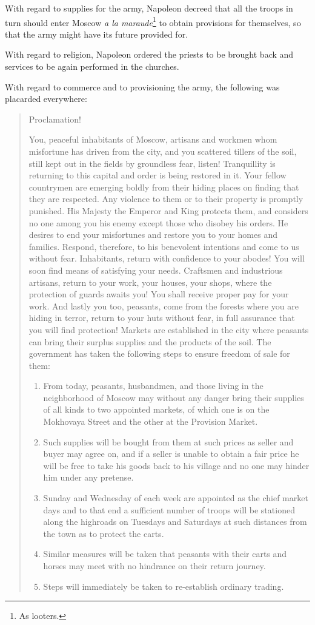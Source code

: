 With regard to supplies for the army, Napoleon decreed that all
the troops in turn should enter Moscow \emph{a la
maraude}\footnote{As looters.} to obtain provisions for
themselves, so that the army might have its future provided for.

With regard to religion, Napoleon ordered the priests to be
brought back and services to be again performed in the churches.

With regard to commerce and to provisioning the army, the
following was placarded everywhere:

\begin{quote} Proclamation!

You, peaceful inhabitants of Moscow, artisans and workmen whom
misfortune has driven from the city, and you scattered tillers of
the soil, still kept out in the fields by groundless fear,
listen!  Tranquillity is returning to this capital and order is
being restored in it. Your fellow countrymen are emerging boldly
from their hiding places on finding that they are respected. Any
violence to them or to their property is promptly punished. His
Majesty the Emperor and King protects them, and considers no one
among you his enemy except those who disobey his orders. He
desires to end your misfortunes and restore you to your homes and
families. Respond, therefore, to his benevolent intentions and
come to us without fear. Inhabitants, return with confidence to
your abodes! You will soon find means of satisfying your
needs. Craftsmen and industrious artisans, return to your work,
your houses, your shops, where the protection of guards awaits
you! You shall receive proper pay for your work. And lastly you
too, peasants, come from the forests where you are hiding in
terror, return to your huts without fear, in full assurance that
you will find protection! Markets are established in the city
where peasants can bring their surplus supplies and the products
of the soil. The government has taken the following steps to
ensure freedom of sale for them: \begin{enumerate} \item From
today, peasants, husbandmen, and those living in the neighborhood
of Moscow may without any danger bring their supplies of all
kinds to two appointed markets, of which one is on the Mokhovaya
Street and the other at the Provision Market.  \item Such
supplies will be bought from them at such prices as seller and
buyer may agree on, and if a seller is unable to obtain a fair
price he will be free to take his goods back to his village and
no one may hinder him under any pretense.  \item Sunday and
Wednesday of each week are appointed as the chief market days and
to that end a sufficient number of troops will be stationed along
the highroads on Tuesdays and Saturdays at such distances from
the town as to protect the carts.  \item Similar measures will be
taken that peasants with their carts and horses may meet with no
hindrance on their return journey.  \item Steps will immediately
be taken to re-establish ordinary trading.  \end{enumerate}


\end{quote}

